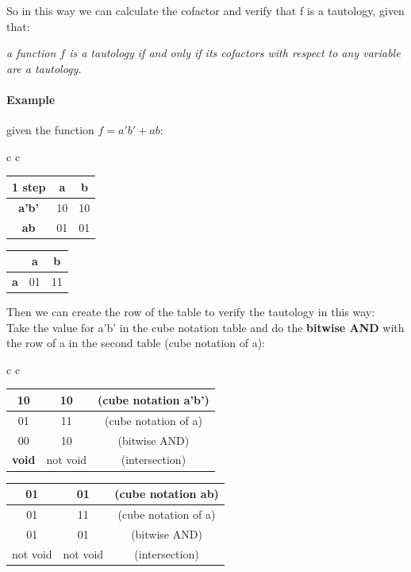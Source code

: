 So in this way we can calculate the cofactor and verify that f is a tautology, given that:

\begin{center}
\textit{a function $f$ is a tautology if and only if its cofactors with respect to any variable are a tautology.}
\end{center}

\paragraph{Example} given the function $f = a'b' + ab$:\\

\begin{center}
	
	\begin{tabular}{c  c}
		\begin{tabular}{c | c | c |}
			1 step & \textbf{a} & \textbf{b} \\ \hline
			\textbf{a'b'} & 10 & 10 \\ \hline 
			\textbf{ab} & 01 & 01 \\ \hline
		\end{tabular}
		\quad
		\quad
		\quad
		\quad
		\quad
		\quad
		\quad
		\begin{tabular}{ c | c | c |}
			{} & \textbf{a} & \textbf{b} \\ \hline
			\textbf{a} & 01 & 11 \\ \hline  
		\end{tabular}
	\end{tabular}
\end{center}

Then we can create the row of the table to verify the tautology in this way:\\

Take the value for a'b' in the cube notation table and do the \textbf{bitwise AND} with the row of a in the second table (cube notation of a):\\

\begin{center}
	\begin{tabular}{c  c}
		\begin{tabular}{c | c | c}
			10 & 10 & (cube notation a'b') \\ \hline
			01 & 11 & (cube notation of a)\\ \hline 
			00 & 10 & (bitwise AND) \\ \hline
			\textbf{void} & not void & (intersection)
		\end{tabular}
		\quad
		\quad
		\quad
		\quad
		\quad
		\quad
		\quad
		\begin{tabular}{c | c | c}
			01 & 01 & (cube notation ab) \\ \hline
			01 & 11 & (cube notation of a)\\ \hline 
			01 & 01 & (bitwise AND) \\ \hline
			not void & not void & (intersection)
		\end{tabular}
	\end{tabular}
\end{center}

